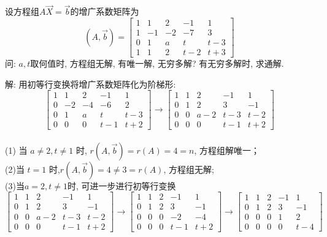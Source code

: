 \begin{eg}
设方程组$A\vec{X}=\vec{b}$的增广系数矩阵为
\begin{displaymath}
(A,\vec{b})=\begin{bmatrix}1&1&2&-1&1\\1&-1&-2&-7&3\\0&1&a&t&t-3\\1&1&2&t-2&t+3
\end{bmatrix}\end{displaymath}
问: $a, t$取何值时,  方程组无解, 有唯一解, 无穷多解? 有无穷多解时,  求通解.

解: 用初等行变换将增广系数矩阵化为阶梯形:
\begin{displaymath}
\begin{bmatrix}1&1&2&-1&1\\0&-2&-4&-6&2\\0&1&a&t&t-3\\0&0&0&t-1&t+2\end{bmatrix}
\rightarrow \begin{bmatrix}1&1&2&-1&1\\0&1&2&3&-1\\0&0&a-2&t-3&t-2\\0&0&0&t-1&t+2\end{bmatrix}
\end{displaymath}
\\(1) 当 $a\not=2, t \not=1$ 时, $r(A,\vec{b})=r(A)=4=n$,  方程组解唯一；\\
(2)当 $t = 1$ 时,$r(A, \vec{b})=4\not=3=r(A)$,  方程组无解;\\
(3)当$a=2, t \not=1$时, 可进一步进行初等行变换
\begin{displaymath}
\begin{bmatrix}1&1&2&-1&1\\0&1&2&3&-1\\0&0&a-2&t-3&t-2\\0&0&0&t-1&t+2\end{bmatrix}
\rightarrow\begin{bmatrix} 1&1&2&-1&1\\0&1&2&3&-1\\0&0&0&-2&-4\\0&0&0&t-1&t+2\end{bmatrix}\rightarrow
\begin{bmatrix} 1&1&2&-1&1\\0&1&2&3&-1\\0&0&0&1&2\\0&0&0&0&t-4\end{bmatrix}\end{displaymath}

\end{eg}
